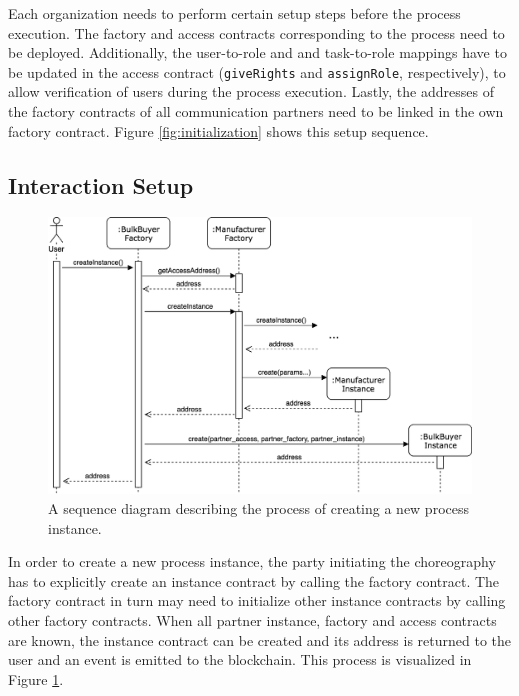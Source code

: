\documentclass[runningheads]{llncs}
\begin{document}
Each organization needs to perform certain setup steps before the process execution.
The factory and access contracts corresponding to the process need to be deployed.
Additionally, the user-to-role and and task-to-role mappings have to be updated in the access contract (\texttt{giveRights} and \texttt{assignRole}, respectively), to allow verification of users during the process execution.
Lastly, the addresses of the factory contracts of all communication partners need to be linked in the own factory contract.
Figure \ref{fig:initialization} shows this setup sequence.

\subsection{Interaction Setup}

\begin{figure}
	\centering
	\includegraphics[width=\textwidth]{fig/instance_creation.eps}
	\caption{A sequence diagram describing the process of creating a new process instance.}
	\label{fig:instance_creation}
\end{figure}

In order to create a new process instance, the party initiating the choreography has to explicitly create an instance contract by calling the factory contract.
The factory contract in turn may need to initialize other instance contracts by calling other factory contracts.
When all partner instance, factory and access contracts are known, the instance contract can be created and its address is returned to the user and an event is emitted to the blockchain.
This process is visualized in Figure \ref{fig:instance_creation}.
\end{document}
